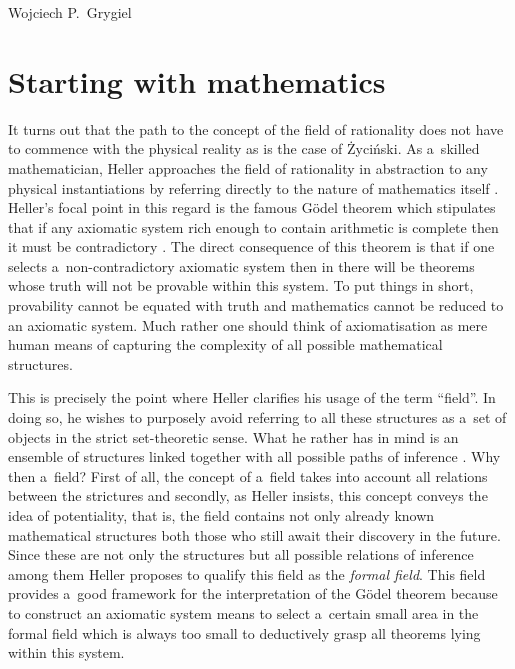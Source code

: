 \begin{artengenv}{Wojciech P.~Grygiel}
\section{Starting with mathematics}
It turns out that the path to the concept of the field of rationality does not have to commence with the physical reality as is the case of Życiński. As a~skilled mathematician, Heller approaches the field of rationality in abstraction to any physical instantiations by referring directly to the nature of mathematics itself
\parencite[][pp.216–238]{heller_uchwycic_1997}. %
 Heller's focal point in this regard is the famous Gödel theorem which stipulates that if any axiomatic system rich enough to contain arithmetic is complete then it must be contradictory 
\parencite[e.g.][pp.66–116]{penrose_shadows_1994}. %
 The direct consequence of this theorem is that if one selects a~non-contradictory axiomatic system then in there will be theorems whose truth will not be provable within this system. To put things in short, provability cannot be equated with truth and mathematics cannot be reduced to an axiomatic system. Much rather one should think of axiomatisation as mere human means of capturing the complexity of all possible mathematical structures.

This is precisely the point where Heller clarifies his usage of the term ``field''. In doing so, he wishes to purposely avoid referring to all these structures as a~set of objects in the strict set-theoretic sense. What he rather has in mind is an ensemble of structures linked together with all possible paths of inference
\parencite[][pp.236–238]{heller_uchwycic_1997}. %
 Why then a~field? First of all, the concept of a~field takes into account all relations between the strictures and secondly, as Heller insists, this concept conveys the idea of potentiality, that is, the field contains not only already known mathematical structures both those who still await their discovery in the future. Since these are not only the structures but all possible relations of inference among them Heller proposes to qualify this field as the \textit{formal field}. This field provides a~good framework for the interpretation of the Gödel theorem because to construct an axiomatic system means to select a~certain small area in the formal field which is always too small to deductively grasp all theorems lying within this system.


\end{artengenv}
